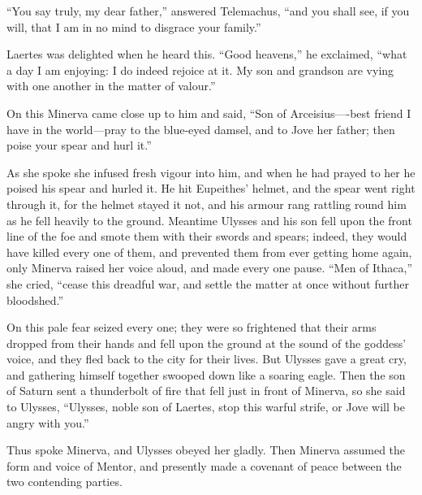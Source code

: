 “You say truly, my dear father,” answered Telemachus, “and you shall see, if
you will, that I am in no mind to disgrace your family.”

Laertes was delighted when he heard this. “Good heavens,” he exclaimed, “what a
day I am enjoying: I do indeed rejoice at it. My son and grandson are vying
with one another in the matter of valour.”

On this Minerva came close up to him and said, “Son of Arceisius—-best friend I
have in the world—pray to the blue-eyed damsel, and to Jove her father; then
poise your spear and hurl it.”

As she spoke she infused fresh vigour into him, and when he had prayed to her
he poised his spear and hurled it. He hit Eupeithes’ helmet, and the spear went
right through it, for the helmet stayed it not, and his armour rang rattling
round him as he fell heavily to the ground. Meantime Ulysses and his son fell
upon the front line of the foe and smote them with their swords and spears;
indeed, they would have killed every one of them, and prevented them from ever
getting home again, only Minerva raised her voice aloud, and made every one
pause. “Men of Ithaca,” she cried, “cease this dreadful war, and settle the
matter at once without further bloodshed.”

On this pale fear seized every one; they were so frightened that their arms
dropped from their hands and fell upon the ground at the sound of the goddess’
voice, and they fled back to the city for their lives. But Ulysses gave a great
cry, and gathering himself together swooped down like a soaring eagle. Then the
son of Saturn sent a thunderbolt of fire that fell just in front of Minerva, so
she said to Ulysses, “Ulysses, noble son of Laertes, stop this warful strife,
or Jove will be angry with you.”

Thus spoke Minerva, and Ulysses obeyed her gladly. Then Minerva assumed the
form and voice of Mentor, and presently made a covenant of peace between the
two contending parties.
